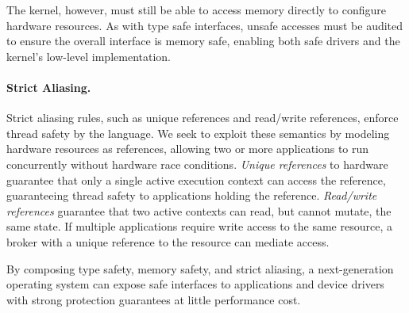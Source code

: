 
The kernel, however, must still be able to access memory directly
to configure hardware resources.
As with type safe interfaces, unsafe accesses must be audited to ensure
the overall interface is memory safe, enabling both safe drivers and
the kernel's low-level implementation.

\paragraph{Strict Aliasing.}
Strict aliasing rules, such as unique references and read/write references,
enforce thread safety
by the language. We seek to
exploit these semantics
by modeling
hardware resources as references, allowing two or more applications to run
concurrently without
hardware race conditions.
\textit{Unique references}
to hardware
guarantee that only a single active execution context
can access the reference,
guaranteeing thread safety to applications holding the reference.
\textit{Read/write references} guarantee that two active contexts can read, but cannot mutate,
the same state.
If multiple applications require write access to the same resource, a broker with a
unique reference to the resource can mediate access.

By composing type safety, memory safety, and strict aliasing, a next-generation
operating system can expose safe interfaces to applications and device drivers
with strong protection guarantees at little performance cost.
